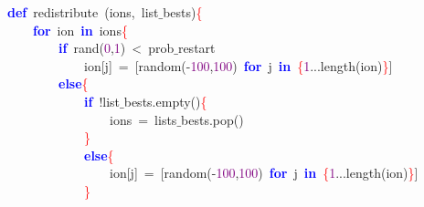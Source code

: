 \noindent
\mbox{}\textbf{\textcolor{Blue}{def}}\ redistribute\ \textcolor{BrickRed}{(}ions\textcolor{BrickRed}{,}\ list$\_$bests\textcolor{BrickRed}{)}\textcolor{Red}{\{} \\
\mbox{}\ \ \ \ \textbf{\textcolor{Blue}{for}}\ ion\ \textbf{\textcolor{Blue}{in}}\ ions\textcolor{Red}{\{} \\
\mbox{}\ \ \ \ \ \ \ \ \textbf{\textcolor{Blue}{if}}\ rand\textcolor{BrickRed}{(}\textcolor{Purple}{0}\textcolor{BrickRed}{,}\textcolor{Purple}{1}\textcolor{BrickRed}{)}\ \textcolor{BrickRed}{\textless{}}\ prob$\_$restart \\
\mbox{}\ \ \ \ \ \ \ \ \ \ \ \ ion\textcolor{BrickRed}{[}j\textcolor{BrickRed}{]}\ \textcolor{BrickRed}{=}\ \textcolor{BrickRed}{[}random\textcolor{BrickRed}{(-}\textcolor{Purple}{100}\textcolor{BrickRed}{,}\textcolor{Purple}{100}\textcolor{BrickRed}{)}\ \textbf{\textcolor{Blue}{for}}\ j\ \textbf{\textcolor{Blue}{in}}\ \textcolor{Red}{\{}\textcolor{Purple}{1}\textcolor{BrickRed}{...}length\textcolor{BrickRed}{(}ion\textcolor{BrickRed}{)}\textcolor{Red}{\}}\textcolor{BrickRed}{]} \\
\mbox{}\ \ \ \ \ \ \ \ \textbf{\textcolor{Blue}{else}}\textcolor{Red}{\{} \\
\mbox{}\ \ \ \ \ \ \ \ \ \ \ \ \textbf{\textcolor{Blue}{if}}\ \textcolor{BrickRed}{!}list$\_$bests\textcolor{BrickRed}{.}empty\textcolor{BrickRed}{()}\textcolor{Red}{\{} \\
\mbox{}\ \ \ \ \ \ \ \ \ \ \ \ \ \ \ \ ions\ \textcolor{BrickRed}{=}\ lists$\_$bests\textcolor{BrickRed}{.}pop\textcolor{BrickRed}{()} \\
\mbox{}\ \ \ \ \ \ \ \ \ \ \ \ \textcolor{Red}{\}} \\
\mbox{}\ \ \ \ \ \ \ \ \ \ \ \ \textbf{\textcolor{Blue}{else}}\textcolor{Red}{\{} \\
\mbox{}\ \ \ \ \ \ \ \ \ \ \ \ \ \ \ \ ion\textcolor{BrickRed}{[}j\textcolor{BrickRed}{]}\ \textcolor{BrickRed}{=}\ \textcolor{BrickRed}{[}random\textcolor{BrickRed}{(-}\textcolor{Purple}{100}\textcolor{BrickRed}{,}\textcolor{Purple}{100}\textcolor{BrickRed}{)}\ \textbf{\textcolor{Blue}{for}}\ j\ \textbf{\textcolor{Blue}{in}}\ \textcolor{Red}{\{}\textcolor{Purple}{1}\textcolor{BrickRed}{...}length\textcolor{BrickRed}{(}ion\textcolor{BrickRed}{)}\textcolor{Red}{\}}\textcolor{BrickRed}{]} \\
\mbox{}\ \ \ \ \ \ \ \ \ \ \ \ \textcolor{Red}{\}} \\
